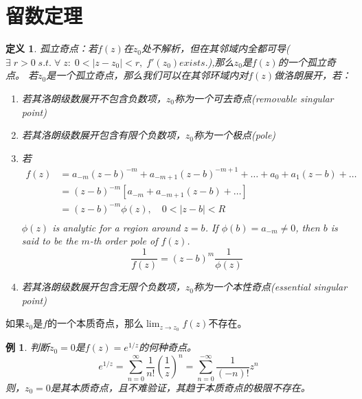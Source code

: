 \documentclass[10pt, a4paper, oneside]{ctexbook}
\newtheorem{definition}[theorem]{定义}
\newtheorem{example}[theorem]{例}
\begin{document}
\section{留数定理}
\begin{definition}
    孤立奇点：若$f(z)$在$z_0$处不解析，但在其邻域内全都可导($\exists \; r > 0\; s.t.\; \forall \;z:\; 0<|z-z_0|<r,\; f'(z_0) exists.$),那么$z_0$是$f(z)$的一个孤立奇点。
    若$z_0$是一个孤立奇点，那么我们可以在其邻环域内对$f(z)$做洛朗展开，若：
    \begin{enumerate}
        \item 若其洛朗级数展开不包含负数项，$z_0$称为一个可去奇点(removable singular point)
        \item 若其洛朗级数展开包含有限个负数项，$z_0$称为一个极点(pole)
        \item 若
        \begin{equation*}
            \begin{aligned}
            f(z) &=a_{-m}(z-b)^{-m}+a_{-m+1}(z-b)^{-m+1}+\ldots+a_{0}+a_{1}(z-b)+\ldots \\
            &=(z-b)^{-m}\left[a_{-m}+a_{-m+1}(z-b)+\ldots\right] \\
            &=(z-b)^{-m} \phi(z), \quad 0<|z-b|<R \\
            \end{aligned}
        \end{equation*}
        $\phi(z)$ is analytic for a region around $z=b$. If $\phi(b)=a_{-m} \neq 0$, then $b$ is said to be the $m$-th order pole of $f(z)$.
        $$
        \frac{1}{f(z)}=(z-b)^{m} \frac{1}{\phi(z)}
        $$
        \item 若其洛朗级数展开包含无限个负数项，$z_0$称为一个本性奇点(essential singular point)
    \end{enumerate}
\end{definition}
如果$z_0$是$f$的一个本质奇点，那么$\lim_{z\to z_0}f(z)$不存在。
\begin{example}判断$z_0=0$是$f(z)=e^{1/z}$的何种奇点。
    \begin{equation*}
        e^{1/z}= \sum_{n=0}^\infty \frac{1}{n!} \left( \frac{1}{z} \right)^n=\sum_{n=0}^{-\infty} \frac{1}{(-n)!} z^n
    \end{equation*}
    则，$z_0=0$是其本质奇点，且不难验证，其趋于本质奇点的极限不存在。
\end{example}
\end{document}
